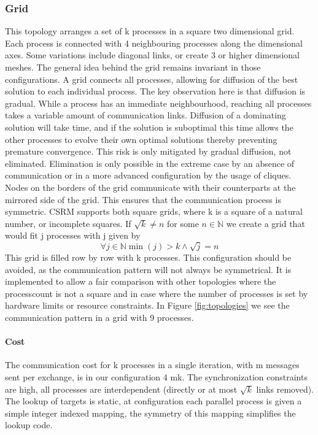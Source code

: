 \subsubsection{Grid}
This topology arranges a set of k processes in a square two dimensional grid. Each process is connected with 4 neighbouring processes along the dimensional axes. Some variations include diagonal links, or create 3 or higher dimensional meshes. The general idea behind the grid remains invariant in those configurations. 
A grid connects all processes, allowing for diffusion of the best solution to each individual process. The key observation here is that diffusion is gradual. While a process has an immediate neighbourhood, reaching all processes takes a variable amount of communication links. Diffusion of a dominating solution will take time, and if the solution is suboptimal this time allows the other processes to evolve their own optimal solutions thereby preventing premature convergence. This risk is only mitigated by gradual diffusion, not eliminated. Elimination is only possible in the extreme case by an absence of communication or in a more advanced configuration by the usage of cliques. 
Nodes on the borders of the grid communicate with their counterparts at the mirrored side of the grid. This ensures that the communication process is symmetric. CSRM supports both square grids, where k is a square of a natural number, or incomplete squares. 
If $\sqrt{k} \neq n $ for some $n \in \mathbb{N}$ we create a grid that would fit j processes with j given by 
\[\forall j \in \mathbb{N} \min(j) > k \land \sqrt{j} = n \] 
This grid is filled row by row with k processes. This configuration should be avoided, as the communication pattern will not always be symmetrical. It is implemented to allow a fair comparison with other topologies where the processcount is not a square and in case where the number of processes is set by hardware limits or resource constraints.
In Figure \ref{fig:topologies} we see the communication pattern in a grid with 9 processes.

\paragraph{Cost}
The communication cost for k processes in a single iteration, with m messages sent per exchange, is in our configuration 4 mk.
The synchronization constraints are high, all processes are interdependent (directly or at most $\sqrt{k}$ links removed).
The lookup of targets is static, at configuration each parallel process is given a simple integer indexed mapping, the symmetry of this mapping simplifies the lookup code.


